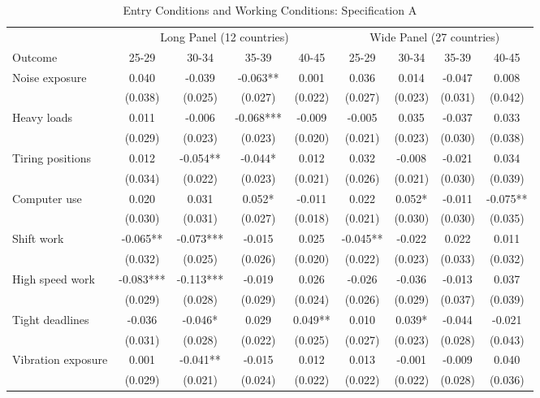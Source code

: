 \begin{table}[htbp]
\centering
\caption{Entry Conditions and Working Conditions: Specification A}
\label{tab:specA_all}
\footnotesize
\begin{threeparttable}
\begin{tabular}{l cccc cccc}
\toprule
 & \multicolumn{4}{c}{Long Panel (12 countries)} & \multicolumn{4}{c}{Wide Panel (27 countries)} \\
\cmidrule(lr){2-5} \cmidrule(lr){6-9}
Outcome & 25-29 & 30-34 & 35-39 & 40-45 & 25-29 & 30-34 & 35-39 & 40-45 \\
\midrule
Noise exposure & 0.040 & -0.039 & -0.063** & 0.001 & 0.036 & 0.014 & -0.047 & 0.008 \\
 & (0.038) & (0.025) & (0.027) & (0.022) & (0.027) & (0.023) & (0.031) & (0.042) \\[3pt]
Heavy loads & 0.011 & -0.006 & -0.068*** & -0.009 & -0.005 & 0.035 & -0.037 & 0.033 \\
 & (0.029) & (0.023) & (0.023) & (0.020) & (0.021) & (0.023) & (0.030) & (0.038) \\[3pt]
Tiring positions & 0.012 & -0.054** & -0.044* & 0.012 & 0.032 & -0.008 & -0.021 & 0.034 \\
 & (0.034) & (0.022) & (0.023) & (0.021) & (0.026) & (0.021) & (0.030) & (0.039) \\[3pt]
Computer use & 0.020 & 0.031 & 0.052* & -0.011 & 0.022 & 0.052* & -0.011 & -0.075** \\
 & (0.030) & (0.031) & (0.027) & (0.018) & (0.021) & (0.030) & (0.030) & (0.035) \\[3pt]
Shift work & -0.065** & -0.073*** & -0.015 & 0.025 & -0.045** & -0.022 & 0.022 & 0.011 \\
 & (0.032) & (0.025) & (0.026) & (0.020) & (0.022) & (0.023) & (0.033) & (0.032) \\[3pt]
High speed work & -0.083*** & -0.113*** & -0.019 & 0.026 & -0.026 & -0.036 & -0.013 & 0.037 \\
 & (0.029) & (0.028) & (0.029) & (0.024) & (0.026) & (0.029) & (0.037) & (0.039) \\[3pt]
Tight deadlines & -0.036 & -0.046* & 0.029 & 0.049** & 0.010 & 0.039* & -0.044 & -0.021 \\
 & (0.031) & (0.028) & (0.022) & (0.025) & (0.027) & (0.023) & (0.028) & (0.043) \\[3pt]
Vibration exposure & 0.001 & -0.041** & -0.015 & 0.012 & 0.013 & -0.001 & -0.009 & 0.040 \\
 & (0.029) & (0.021) & (0.024) & (0.022) & (0.022) & (0.022) & (0.028) & (0.036) \\[3pt]

\end{tabular}
\end{threeparttable}
\end{table}
